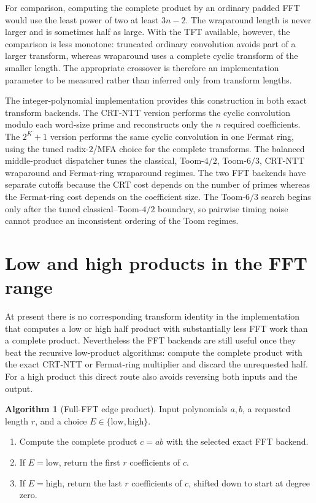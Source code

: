 \documentclass[11pt]{book}
\theoremstyle{definition}
\newtheorem{algorithm}[theorem]{Algorithm}
\begin{document}
For comparison, computing the complete product by an ordinary padded FFT would
use the least power of two at least $3n-2$.  The wraparound length is never
larger and is sometimes half as large.  With the TFT available, however, the
comparison is less monotone: truncated ordinary convolution avoids part of a
larger transform, whereas wraparound uses a complete cyclic transform of the
smaller length.  The appropriate crossover is therefore an implementation
parameter to be measured rather than inferred only from transform lengths.

The integer-polynomial implementation provides this construction in both
exact transform backends.  The CRT-NTT version performs the cyclic convolution
modulo each word-size prime and reconstructs only the $n$ required
coefficients.  The $2^K+1$ version performs the same cyclic convolution in one
Fermat ring, using the tuned radix-$2$/MFA choice for the complete transforms.
The balanced middle-product dispatcher tunes the classical, Toom-$4/2$,
Toom-$6/3$, CRT-NTT wraparound and Fermat-ring wraparound regimes.  The two
FFT backends have separate cutoffs because the CRT cost depends on the number
of primes whereas the Fermat-ring cost depends on the coefficient size.  The
Toom-$6/3$ search begins only after the tuned classical--Toom-$4/2$ boundary,
so pairwise timing noise cannot produce an inconsistent ordering of the Toom
regimes.

\section{Low and high products in the FFT range}
\label{sec:fft-low-high-full}

At present there is no corresponding transform identity in the implementation
that computes a low or high half product with substantially less FFT work than
a complete product.  Nevertheless the FFT backends are still useful once they
beat the recursive low-product algorithms: compute the complete product with
the exact CRT-NTT or Fermat-ring multiplier and discard the unrequested half.
For a high product this direct route also avoids reversing both inputs and the
output.

\begin{algorithm}[Full-FFT edge product]
\label{alg:fft-edge-full}
Input polynomials $a,b$, a requested length $r$, and a choice
$E\in\{\mathrm{low},\mathrm{high}\}$.
\begin{enumerate}
 \item Compute the complete product $c=ab$ with the selected exact FFT backend.
 \item If $E=\mathrm{low}$, return the first $r$ coefficients of $c$.
 \item If $E=\mathrm{high}$, return the last $r$ coefficients of $c$, shifted
 down to start at degree zero.
\end{enumerate}
\end{algorithm}
\end{document}
